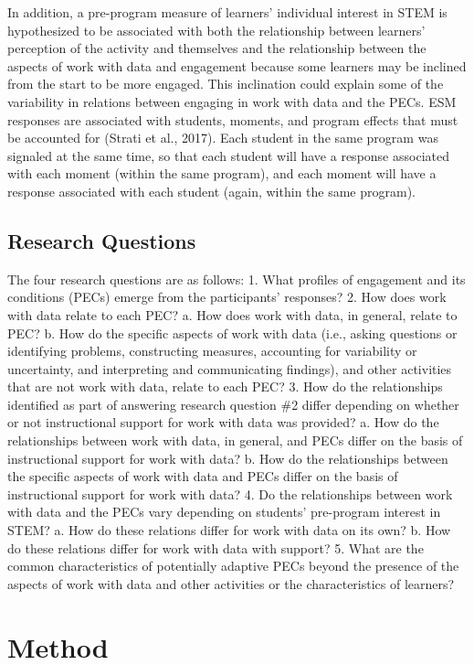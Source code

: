 \documentclass[]{msu-thesis}
\theoremstyle{definition}
\theoremstyle{definition}
\theoremstyle{definition}
\theoremstyle{remark}
\begin{document}
In addition, a pre-program measure of learners' individual interest in
STEM is hypothesized to be associated with both the relationship between
learners' perception of the activity and themselves and the relationship
between the aspects of work with data and engagement because some
learners may be inclined from the start to be more engaged. This
inclination could explain some of the variability in relations between
engaging in work with data and the PECs. ESM responses are associated
with students, moments, and program effects that must be accounted for
(Strati et al., 2017). Each student in the same program was signaled at
the same time, so that each student will have a response associated with
each moment (within the same program), and each moment will have a
response associated with each student (again, within the same program).

\section{Research Questions}\label{research-questions}

The four research questions are as follows: 1. What profiles of
engagement and its conditions (PECs) emerge from the participants'
responses? 2. How does work with data relate to each PEC? a. How does
work with data, in general, relate to PEC? b. How do the specific
aspects of work with data (i.e., asking questions or identifying
problems, constructing measures, accounting for variability or
uncertainty, and interpreting and communicating findings), and other
activities that are not work with data, relate to each PEC? 3. How do
the relationships identified as part of answering research question \#2
differ depending on whether or not instructional support for work with
data was provided? a. How do the relationships between work with data,
in general, and PECs differ on the basis of instructional support for
work with data? b. How do the relationships between the specific aspects
of work with data and PECs differ on the basis of instructional support
for work with data? 4. Do the relationships between work with data and
the PECs vary depending on students' pre-program interest in STEM? a.
How do these relations differ for work with data on its own? b. How do
these relations differ for work with data with support? 5. What are the
common characteristics of potentially adaptive PECs beyond the presence
of the aspects of work with data and other activities or the
characteristics of learners?

\chapter{Method}\label{method}
\end{document}
